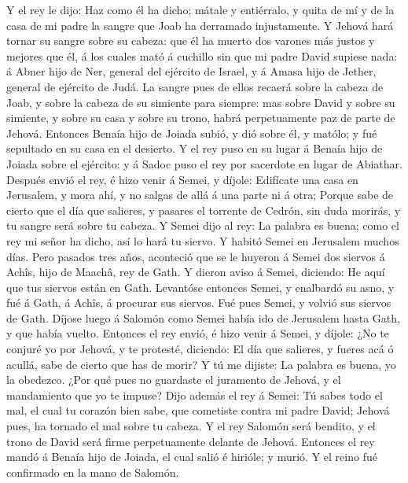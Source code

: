  Y el rey le dijo: Haz como él ha dicho; mátale y
entiérralo, y quita de mí y de la casa de mi padre la sangre que Joab ha
derramado injustamente.  Y Jehová hará tornar su sangre
sobre su cabeza: que él ha muerto dos varones más justos y mejores que
él, á los cuales mató á cuchillo sin que mi padre David supiese nada: á
Abner hijo de Ner, general del ejército de Israel, y á Amasa hijo de
Jether, general de ejército de Judá.  La sangre pues de
ellos recaerá sobre la cabeza de Joab, y sobre la cabeza de su simiente
para siempre: mas sobre David y sobre su simiente, y sobre su casa y
sobre su trono, habrá perpetuamente paz de parte de Jehová.
 Entonces Benaía hijo de Joiada subió, y dió sobre él, y
matólo; y fué sepultado en su casa en el desierto.  Y el
rey puso en su lugar á Benaía hijo de Joiada sobre el ejército: y á
Sadoc puso el rey por sacerdote en lugar de Abiathar. 
Después envió el rey, é hizo venir á Semei, y díjole: Edifícate una casa
en Jerusalem, y mora ahí, y no salgas de allá á una parte ni á otra;
 Porque sabe de cierto que el día que salieres, y pasares
el torrente de Cedrón, sin duda morirás, y tu sangre será sobre tu
cabeza.  Y Semei dijo al rey: La palabra es buena; como el
rey mi señor ha dicho, así lo hará tu siervo. Y habitó Semei en
Jerusalem muchos días.  Pero pasados tres años, aconteció
que se le huyeron á Semei dos siervos á Achîs, hijo de Maachâ, rey de
Gath. Y dieron aviso á Semei, diciendo: He aquí que tus siervos están en
Gath.  Levantóse entonces Semei, y enalbardó su asno, y fué
á Gath, á Achîs, á procurar sus siervos. Fué pues Semei, y volvió sus
siervos de Gath.  Díjose luego á Salomón como Semei había
ido de Jerusalem hasta Gath, y que había vuelto.  Entonces
el rey envió, é hizo venir á Semei, y díjole: ¿No te conjuré yo por
Jehová, y te protesté, diciendo: El día que salieres, y fueres acá ó
acullá, sabe de cierto que has de morir? Y tú me dijiste: La palabra es
buena, yo la obedezco.  ¿Por qué pues no guardaste el
juramento de Jehová, y el mandamiento que yo te impuse? 
Dijo además el rey á Semei: Tú sabes todo el mal, el cual tu corazón
bien sabe, que cometiste contra mi padre David; Jehová pues, ha tornado
el mal sobre tu cabeza.  Y el rey Salomón será bendito, y
el trono de David será firme perpetuamente delante de Jehová.
 Entonces el rey mandó á Benaía hijo de Joiada, el cual
salió é hirióle; y murió. Y el reino fué confirmado en la mano de
Salomón.

